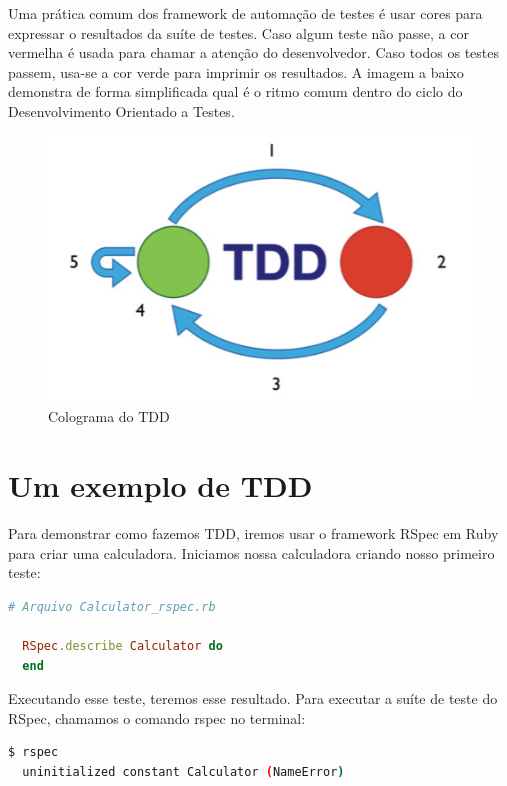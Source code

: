 \documentclass[12pt]{article}
\begin{document}
  Uma prática comum dos framework de automação de testes é usar cores
  para expressar o resultados da suíte de testes. Caso algum teste não passe,
  a cor vermelha é usada para chamar a atenção do desenvolvedor. Caso todos os
  testes passem, usa-se a cor verde para imprimir os resultados. A 
  imagem a baixo demonstra de forma simplificada qual é o ritmo comum dentro do
  ciclo do Desenvolvimento Orientado a Testes.

  \begin{figure}[H]
    \centering
    \includegraphics[scale=1.0]{tdd_micro}
    \caption{Colograma do TDD}
  \end{figure}

  \section{Um exemplo de TDD}

  Para demonstrar como fazemos TDD, iremos usar o framework RSpec em Ruby para
  criar uma calculadora. Iniciamos nossa calculadora criando nosso primeiro 
  teste:

  \begin{lstlisting}[language=Ruby]
  # Arquivo Calculator_rspec.rb

  RSpec.describe Calculator do
  end
  \end{lstlisting}

  Executando esse teste, teremos esse resultado. Para executar a suíte de teste
  do RSpec, chamamos o comando rspec no terminal:

  \begin{lstlisting}[language=bash]
  $ rspec
  uninitialized constant Calculator (NameError)
  \end{lstlisting}
\end{document}
